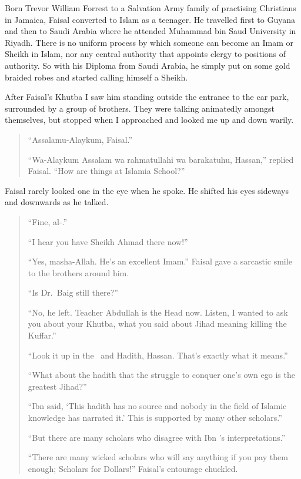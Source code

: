 \documentclass[12pt]{memoir}
\begin{document}
Born Trevor William Forrest to a Salvation Army family
of practising Christians in Jamaica,
Faisal converted to Islam as a teenager.
He travelled first to Guyana and then to Saudi Arabia
where he attended Muhammad bin Saud University in Riyadh.
There is no uniform process by which someone
can become an Imam or Sheikh in Islam,
nor any central authority that appoints clergy to positions of authority.
So with his Diploma from Saudi Arabia,
he simply put on some gold braided robes
and started calling himself a Sheikh.

After Faisal’s Khutba I saw him standing outside the entrance to the car park,
surrounded by a group of brothers.
They were talking animatedly amongst themselves,
but stopped when I approached and looked me up and down warily.

\begin{quote}
“Assalamu-Alaykum, Faisal.”

“Wa-Alaykum Assalam wa rahmatullahi wa barakatuhu, Hassan,” replied Faisal.
“How are things at Islamia School?”
\end{quote}

Faisal rarely looked one in the eye when he spoke.
He shifted his eyes sideways and downwards as he talked.

\begin{quote}
“Fine, al-.”

“I hear you have Sheikh Ahmad there now!”

“Yes, masha-Allah.
He’s an excellent Imam.”
Faisal gave a sarcastic smile to the brothers around him.

“Is Dr.\ Baig still there?”

“No, he left.
Teacher Abdullah is the Head now.
Listen, I wanted to ask you about your Khutba,
what you said about Jihad meaning killing the Kuffar.”

“Look it up in the \Quran\ and Hadith, Hassan.
That’s exactly what it means.”

“What about the hadith that the struggle to conquer one’s own ego
is the greatest Jihad?”

“Ibn  said,
‘This hadith has no source and nobody in the field of Islamic knowledge
has narrated it.’
This is supported by many other scholars.”

“But there are many scholars who disagree
with Ibn ’s interpretations.”

“There are many wicked scholars who will say anything if you pay them enough;
Scholars for Dollars!”
Faisal’s entourage chuckled.
\end{quote}
\end{document}
